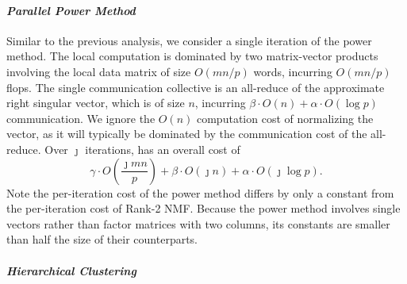 \documentclass[conference,compsoc]{IEEEtran}
\begin{document}
\paragraph{\emph{Parallel Power Method}}

Similar to the previous analysis, we consider a single iteration of the power method.
The local computation is dominated by two matrix-vector products involving the local data matrix of size $O(mn/p)$ words, incurring $O(mn/p)$ flops.
The single communication collective is an all-reduce of the approximate right singular vector, which is of size $n$, incurring $\beta \cdot O(n) + \alpha \cdot O(\log p)$ communication.
We ignore the $O(n)$ computation cost of normalizing the vector, as it will typically be dominated by the communication cost of the all-reduce.
Over $\jmath$ iterations,  has an overall cost of
\begin{equation}
\label{eq:powmethcost}
\gamma \cdot O\left( \frac{\jmath mn}{p} \right) + \beta \cdot O(\jmath n) + \alpha \cdot O(\jmath \log p).
\end{equation}
Note the per-iteration cost of the power method differs by only a constant from the per-iteration cost of Rank-2 NMF.
Because the power method involves single vectors rather than factor matrices with two columns, its constants are smaller than half the size of their counterparts.

\paragraph{\emph{Hierarchical Clustering}}
\end{document}
